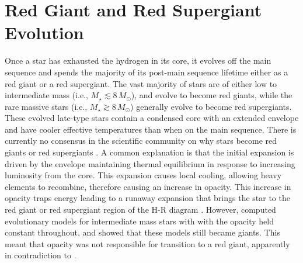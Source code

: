 \section{Red Giant and Red Supergiant Evolution}\label{sec:1.5}
Once a star has exhausted the hydrogen in its core, it evolves off the main sequence and spends the majority of its post-main sequence lifetime either as a red giant or a red supergiant. The vast majority of stars are of either low to intermediate mass (i.e., $M_{\star} \lesssim 8\,M_{\odot}$), and evolve to become red giants, while the rare massive stars (i.e., $M_{\star} \gtrsim 8\,M_{\odot}$) generally evolve to become red supergiants. These evolved late-type stars contain a condensed core with an extended envelope and have cooler effective temperatures than when on the main sequence. There is currently no consensus in the scientific community on why stars become red giants or red supergiants \citep[e.g.,][]{sugimoto_2000,stancliffe_2009}. A common explanation is that the initial expansion is driven by the envelope maintaining thermal equilibrium in response to increasing luminosity from the core. This expansion causes local cooling, allowing heavy elements to recombine, therefore causing an increase in opacity. This increase in opacity traps energy leading to a runaway expansion that brings the star to the red giant or red supergiant region of the H-R diagram \citep{renzini_1992}. However, \cite{iben_1993} computed evolutionary models for intermediate mass stars with with the opacity held constant throughout, and showed that these models still became giants. This meant that opacity was not responsible for transition to a red giant, apparently in contradiction to \cite{renzini_1992}. 


